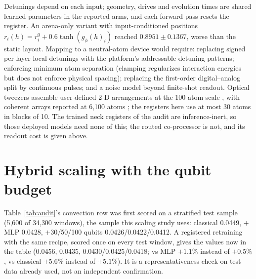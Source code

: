 \documentclass{article}
\newcommand{\QLgeo}{$0.8951 \pm 0.1367$}
\begin{document}
Detunings depend on each input; geometry, drives and evolution times are shared learned parameters in the reported
arms, and each forward pass resets the register. An arena-only variant with input-conditioned positions
$r_i(h) = r_i^0 + 0.6\tanh(g_\phi(h)_i)$ reached \QLgeo, worse than the static layout. Mapping to a neutral-atom device
would require: replacing signed per-layer local detunings with the platform's addressable detuning patterns; enforcing
minimum atom separation (clamping regularizes interaction energies but does not enforce physical spacing); replacing the
first-order digital--analog split by continuous pulses; and a noise model beyond finite-shot readout. Optical tweezers
assemble user-defined 2-D arrangements at the 100-atom scale \citep{barredo2018synthetic}, with coherent arrays reported
at 6{,}100 atoms \citep{manetsch2025tweezer}; the registers here use at most 30 atoms in blocks of 10. The trained neck
registers of the audit are inference-inert, so those deployed models need none of this; the routed co-processor is not,
and its readout cost is given above.

\section{Hybrid scaling with the qubit budget}
\label{app:hscale}

Table~\ref{tab:audit}'s convection row was first scored on a stratified test sample (5{,}600 of 34{,}300 windows), the sample this scaling study uses: classical 0.0449, $+$MLP 0.0428, $+$30/50/100 qubits 0.0426/0.0422/0.0412. A registered retraining with the same recipe, scored once on every test window, gives the values now in the table (0.0456, 0.0435, 0.0430/0.0425/0.0418; vs MLP $+1.1\%$ instead of $+0.5\%$, vs classical $+5.6\%$ instead of $+5.1\%$). It is a representativeness check on test data already used, not an independent confirmation.
\end{document}
